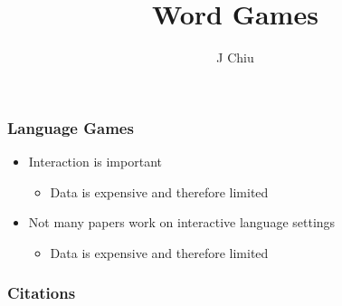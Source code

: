 \documentclass{beamer}
\title{Word Games}
\author{J Chiu}
\begin{document}
\begin{frame}[plain]
\titlepage
\end{frame}

\begin{frame}
\frametitle{Language Games}
\begin{itemize}
\item Interaction is important 
    \begin{itemize}
    \item Data is expensive and therefore limited
    \end{itemize}
\item Not many papers work on interactive language settings
    \begin{itemize}
    \item Data is expensive and therefore limited
    \end{itemize}
\end{itemize}
\end{frame}

\begin{frame}[allowframebreaks]
\frametitle{Citations}
\printbibliography
\end{frame}
\end{document}
